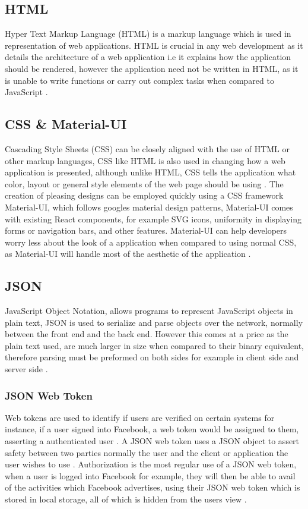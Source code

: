 \subsection{HTML}
Hyper Text Markup Language (HTML) is a markup language which is used in representation of web applications. HTML is crucial in any web development as it details the architecture of a web application i.e it explains how the application should be rendered, however the application need not be written in HTML, as it is unable to write functions or carry out complex tasks when compared to JavaScript \cite{minnick2020responsive}.

\subsection{CSS \& Material-UI}
Cascading Style Sheets (CSS) can be closely aligned with the use of HTML or other markup languages, CSS like HTML is also used in changing how a web application is presented, although unlike HTML, CSS tells the application what color, layout or general style elements of the web page should be using \cite{geneves2012analysis}. The creation of pleasing designs can be employed quickly using a CSS framework Material-UI, which follows googles material design patterns, Material-UI comes with existing React components, for example SVG icons, uniformity in displaying forms or navigation bars, and other features. Material-UI can help developers worry less about the look of a application when compared to using normal CSS, as Material-UI will handle most of the aesthetic of the application \cite{nguyen2022building}.

\subsection{JSON}
JavaScript Object Notation, allows programs to represent JavaScript objects in plain text, JSON is used to serialize and parse objects over the network, normally between the front end and the back end. However this comes at a price as the plain text used, are much larger in size when compared to their binary equivalent, therefore parsing must be preformed on both sides for example in client side and server side \cite{JSON}.

\subsubsection{JSON Web Token}
Web tokens are used to identify if users are verified on certain systems for instance, if a user signed into Facebook, a web token would be assigned to them, asserting a authenticated user \cite{JWT}. A JSON web token uses a JSON object to assert safety between two parties normally the user and the client or application the user wishes to use \cite{jones2015json}. Authorization is the most regular use of a JSON web token, when a user is logged into Facebook for example, they will then be able to avail of the activities which Facebook advertises, using their JSON web token which is stored in local storage, all of which is hidden from the users view \cite{JWT}.


